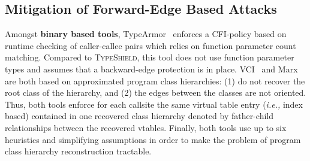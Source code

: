 \subsection{Mitigation of Forward-Edge Based Attacks}
\label{C++ Indirect Calls in Practice}
Amongst \textbf{binary based tools}, TypeArmor~\cite{veen:typearmor}
enforces a CFI-policy based on runtime checking of caller-callee pairs which relies
on function parameter count matching. Compared to \textsc{TypeShield}, this tool does not use function 
parameter types and assumes that a backward-edge protection is in place.
VCI~\cite{vci:asiaccs} and Marx~\cite{marx} are both based on approximated program class hierarchies: 
(1) do not recover the root class of the hierarchy, and (2) the edges between the classes are not oriented. Thus, both tools 
enforce for each callsite the same virtual table entry (\textit{i.e.,} index based) 
contained in one recovered class hierarchy denoted by father-child relationships between the recovered vtables. 
Finally, both tools use up to six heuristics and simplifying assumptions in order to make the problem of program
class hierarchy reconstruction tractable.

